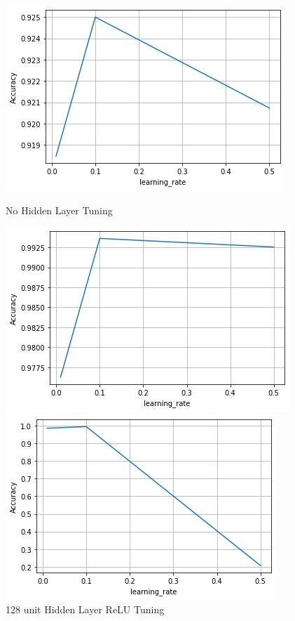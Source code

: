 \documentclass[11pt]{homework}
\begin{document}
\begin{figure}[h!]
  \centering
  \begin{minipage}[h]{0.3\textwidth}
    \includegraphics[width=\textwidth]{hyper-0.png}
    \caption{No Hidden Layer Tuning}
    \label{hyper-0}
  \end{minipage}
\hfill
   \begin{minipage}[h]{0.3\textwidth}
    \includegraphics[width=\textwidth]{hyper-1-128-relu.png}
    \caption{128 unit Hidden Layer ReLU Tuning}
    \label{hyper-1-128-relu}
  \end{minipage}
\hfill
   \begin{minipage}[h]{0.3\textwidth}
    \includegraphics[width=\textwidth]{hyper-2-128-relu.png}

\end{minipage}
\end{figure}
\end{document}
